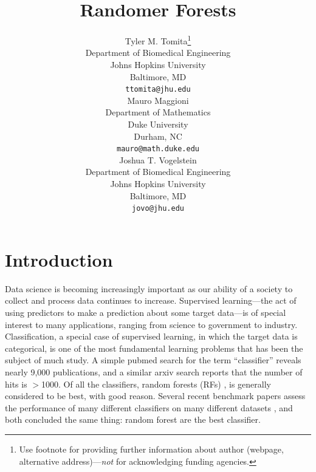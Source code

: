 \documentclass{article} %
\title{Randomer Forests}
\author{
Tyler M. Tomita\thanks{ Use footnote for providing further information
about author (webpage, alternative address)---\emph{not} for acknowledging
funding agencies.} \\
Department of Biomedical Engineering\\
Johns Hopkins University\\
Baltimore, MD \\
\texttt{ttomita@jhu.edu} \\
\And
Mauro Maggioni \\
Department of Mathematics \\
Duke University \\
Durham, NC \\
\texttt{mauro@math.duke.edu} \\
\And
Joshua T. Vogelstein \\
Department of Biomedical Engineering \\
Johns Hopkins University \\
Baltimore, MD \\
\texttt{jovo@jhu.edu} \\
}
\newcommand{\jovo}[1]{{\color{magenta}{\it jovo says: #1}}}
\begin{document}
\maketitle

\begin{abstract}
\jovo{please make this submittable asap.  this means include bib, put figures in the right place, anonymize, etc.}
\end{abstract}

\section{Introduction}

Data science is becoming increasingly important as our ability of a society to collect and process data continues to increase.  Supervised learning---the act of using predictors to make a prediction about some target data---is of special interest to many applications, ranging from science to government to industry.  Classification, a special case of supervised learning, in which the target data is categorical, is one of the most fundamental learning problems that has been the subject of much study.  A simple pubmed search for the term ``classifier'' reveals nearly 9,000 publications, and a similar arxiv search reports that the number of hits is $>$1000.  Of all the classifiers, random forests (RFs) \cite{Breiman2001}, is generally considered to be best, with good reason.  Several recent benchmark papers assess the performance of many different classifiers on many different datasets \cite{Delgado2014,Caruana2008}, and both concluded the same thing: random forest are the best classifier.
\end{document}
